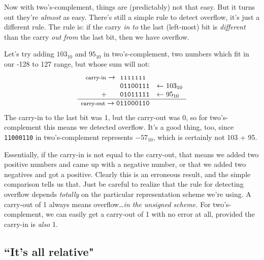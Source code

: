 Now with two's-complement, things are (predictably) not that easy. But it
turns out they're \textit{almost} as easy. There's still a simple rule to
detect overflow, it's just a different rule. The rule is: if the carry
\textit{in to} the last (left-most) bit is \textit{different} than the
carry \textit{out from} the last bit, then we have overflow.

Let's try adding $103_{10}$ and $95_{10}$ in two's-complement, two numbers
which fit in our -128 to 127 range, but whose sum will not:
\[
\begin{array}{*{9}{c@{\hspace{0pt}}}{l}}
{\footnotesize \text{carry-in}} \rightarrow & \texttt{{\footnotesize 1}} & \texttt{{\footnotesize 1}} & \texttt{{\footnotesize 1}}  & \texttt{{\footnotesize 1}} & \texttt{{\footnotesize 1}} & \texttt{{\footnotesize 1}} & \texttt{{\footnotesize 1}} & \\
  & \texttt{0} & \texttt{1} & \texttt{1} & \texttt{0} & \texttt{0} & \texttt{1} & \texttt{1} & \texttt{1} 
& \quad \textsl{$\leftarrow$ $103_{10}$}\\
\quad + & \texttt{0} & \texttt{1} & \texttt{0} & \texttt{1} & \texttt{1} & \texttt{1} & \texttt{1} & \texttt{1} 
& \quad \textsl{$\leftarrow$ $95_{10}$}\\
\hline
{\footnotesize \text{carry-out}} \rightarrow \texttt{0} & \texttt{1} & \texttt{1} & \texttt{0} & \texttt{0} & \texttt{0} & \texttt{1} & \texttt{1} & \texttt{0} \\
\end{array}
\]
The carry-in to the last bit was 1, but the carry-out was 0, so for
two's-complement this means we detected overflow. It's a good thing, too,
since \texttt{11000110} in two's-complement represents $-57_{10}$, which is
certainly not 103 + 95.

Essentially, if the carry-in is not equal to the carry-out, that means we
added two positive numbers and came up with a negative number, or that we
added two negatives and got a positive. Clearly this is an erroneous
result, and the simple comparison tells us that. Just be careful to realize
that the rule for detecting overflow depends \textit{totally} on the
particular representation scheme we're using. A carry-out of 1 always means
overflow\dots \textit{in the unsigned scheme.} For two's-complement, we can
easily get a carry-out of 1 with no error at all, provided the carry-in is
\textit{also} 1.

\subsection{``It's all relative"}

